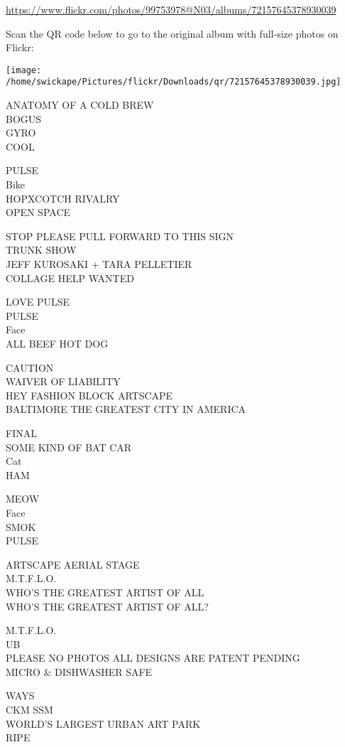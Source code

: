 \documentclass[10pt,letterpaper]{article}
\begin{document}
\url{https://www.flickr.com/photos/99753978@N03/albums/72157645378930039}

Scan the QR code below to go to the original album with full-size photos on Flickr:

\texttt{[image: /home/swickape/Pictures/flickr/Downloads/qr/72157645378930039.jpg]}


ANATOMY OF A COLD BREW\\
BOGUS\\
GYRO\\
COOL

PULSE\\
Bike\\
HOPXCOTCH RIVALRY\\
OPEN SPACE

STOP PLEASE PULL FORWARD TO THIS SIGN\\
TRUNK SHOW\\
JEFF KUROSAKI + TARA PELLETIER\\
COLLAGE HELP WANTED

LOVE PULSE\\
PULSE\\
Face\\
ALL BEEF HOT DOG

CAUTION\\
WAIVER OF LIABILITY\\
HEY FASHION BLOCK ARTSCAPE\\
BALTIMORE THE GREATEST CITY IN AMERICA

FINAL\\
SOME KIND OF BAT CAR\\
Cat\\
HAM

MEOW\\
Face\\
SMOK\\
PULSE

ARTSCAPE AERIAL STAGE\\
M.T.F.L.O.\\
WHO'S THE GREATEST ARTIST OF ALL\\
WHO'S THE GREATEST ARTIST OF ALL?

M.T.F.L.O.\\
UB\\
PLEASE NO PHOTOS ALL DESIGNS ARE PATENT PENDING\\
MICRO \& DISHWASHER SAFE

WAYS\\
CKM SSM\\
WORLD'S LARGEST URBAN ART PARK\\
RIPE
\end{document}

